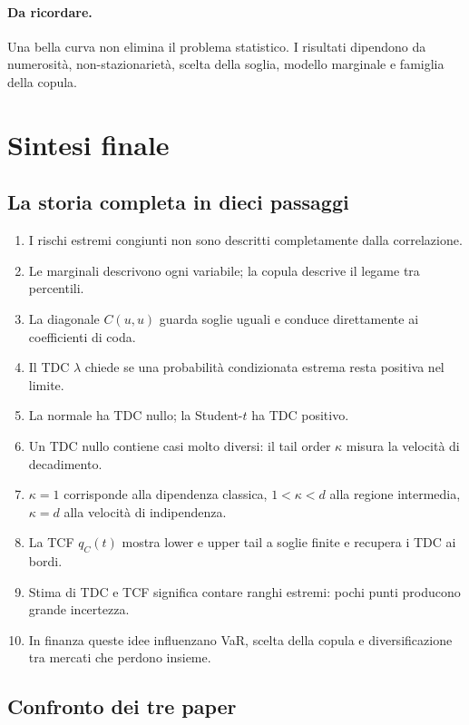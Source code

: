 \documentclass[11pt,a4paper]{article}
\newcommand{\Ricorda}{\paragraph{Da ricordare.}}
\begin{document}
\Ricorda Una bella curva non elimina il problema statistico. I risultati
dipendono da numerosità, non-stazionarietà, scelta della soglia, modello
marginale e famiglia della copula.

\newpage
\section{Sintesi finale}

\subsection{La storia completa in dieci passaggi}

\begin{enumerate}
  \item I rischi estremi congiunti non sono descritti completamente dalla
  correlazione.
  \item Le marginali descrivono ogni variabile; la copula descrive il legame tra
  percentili.
  \item La diagonale $C(u,u)$ guarda soglie uguali e conduce direttamente ai
  coefficienti di coda.
  \item Il TDC $\lambda$ chiede se una probabilità condizionata estrema resta
  positiva nel limite.
  \item La normale ha TDC nullo; la Student-$t$ ha TDC positivo.
  \item Un TDC nullo contiene casi molto diversi: il tail order $\kappa$ misura
  la velocità di decadimento.
  \item $\kappa=1$ corrisponde alla dipendenza classica, $1<\kappa<d$ alla
  regione intermedia, $\kappa=d$ alla velocità di indipendenza.
  \item La TCF $q_C(t)$ mostra lower e upper tail a soglie finite e recupera i
  TDC ai bordi.
  \item Stima di TDC e TCF significa contare ranghi estremi: pochi punti
  producono grande incertezza.
  \item In finanza queste idee influenzano VaR, scelta della copula e
  diversificazione tra mercati che perdono insieme.
\end{enumerate}

\subsection{Confronto dei tre paper}
\end{document}
